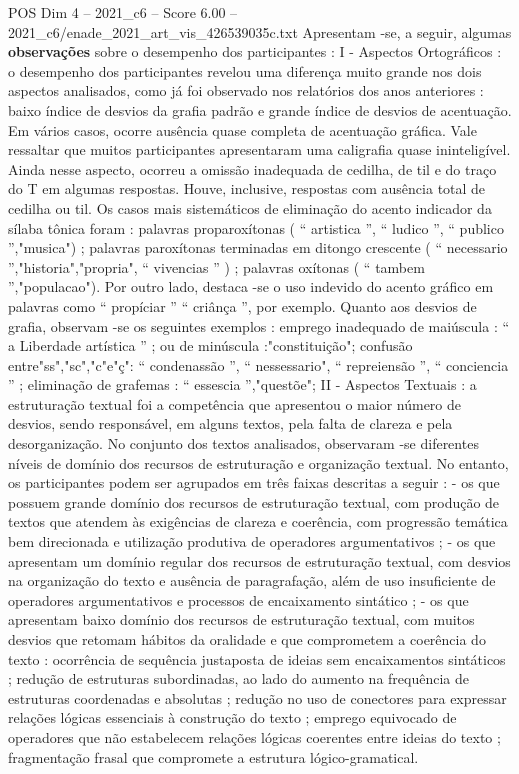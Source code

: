 \begin{textsample}{POS Dim 4 – 2021\_c6 – Score 6.00 – 2021\_c6/enade\_2021\_art\_vis\_426539035c.txt}
Apresentam -se, a seguir, algumas \textbf{observações} sobre o desempenho dos participantes : I - Aspectos Ortográficos : o desempenho dos participantes revelou uma diferença muito grande nos dois aspectos analisados, como já foi observado nos relatórios dos anos anteriores : baixo índice de desvios da grafia padrão e grande índice de desvios de acentuação.
Em vários casos, ocorre ausência quase completa de acentuação gráfica.
Vale ressaltar que muitos participantes apresentaram uma caligrafia quase ininteligível.
Ainda nesse aspecto, ocorreu a omissão inadequada de cedilha, de til e do traço do T em algumas respostas.
Houve, inclusive, respostas com ausência total de cedilha ou til.
Os casos mais sistemáticos de eliminação do acento indicador da sílaba tônica foram : palavras proparoxítonas ( “ artistica ”, “ ludico ”, “ publico ”,"musica") ; palavras paroxítonas terminadas em ditongo crescente ( “ necessario ”,"historia","propria", “ vivencias ” ) ; palavras oxítonas ( “ tambem ”,"populacao").
Por outro lado, destaca -se o uso indevido do acento gráfico em palavras como “ propíciar ” “ criânça ”, por exemplo.
Quanto aos desvios de grafia, observam -se os seguintes exemplos : emprego inadequado de maiúscula : “ a Liberdade artística ” ; ou de minúscula :"constituição"; confusão entre"ss","sc","c"e"ç": “ condenassão ”, “ nessessario", “ repreiensão ”, “ conciencia ” ; eliminação de grafemas : “ essescia ”,"questõe"; II - Aspectos Textuais : a estruturação textual foi a competência que apresentou o maior número de desvios, sendo responsável, em alguns textos, pela falta de clareza e pela desorganização.
No conjunto dos textos analisados, observaram -se diferentes níveis de domínio dos recursos de estruturação e organização textual.
No entanto, os participantes podem ser agrupados em três faixas descritas a seguir : - os que possuem grande domínio dos recursos de estruturação textual, com produção de textos que atendem às exigências de clareza e coerência, com progressão temática bem direcionada e utilização produtiva de operadores argumentativos ; - os que apresentam um domínio regular dos recursos de estruturação textual, com desvios na organização do texto e ausência de paragrafação, além de uso insuficiente de operadores argumentativos e processos de encaixamento sintático ; - os que apresentam baixo domínio dos recursos de estruturação textual, com muitos desvios que retomam hábitos da oralidade e que comprometem a coerência do texto : ocorrência de sequência justaposta de ideias sem encaixamentos sintáticos ; redução de estruturas subordinadas, ao lado do aumento na frequência de estruturas coordenadas e absolutas ; redução no uso de conectores para expressar relações lógicas essenciais à construção do texto ; emprego equivocado de operadores que não estabelecem relações lógicas coerentes entre ideias do texto ; fragmentação frasal que compromete a estrutura lógico-gramatical.

\end{textsample}

